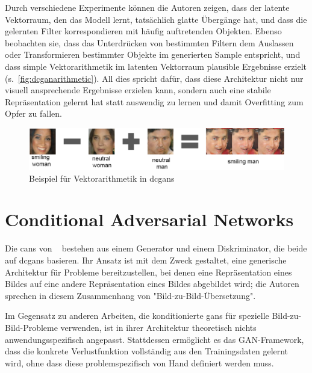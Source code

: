 Durch verschiedene Experimente können die Autoren zeigen, dass der latente Vektorraum, den das Modell lernt, tatsächlich glatte Übergänge hat, und dass die gelernten Filter korrespondieren mit häufig auftretenden Objekten.
Ebenso beobachten sie, dass das Unterdrücken von bestimmten Filtern dem Auslassen oder Transformieren bestimmter Objekte im generierten Sample entspricht, und dass simple Vektorarithmetik im latenten Vektorraum plausible Ergebnisse erzielt (s.~\autoref{fig:dcganarithmetic}).
All dies spricht dafür, dass diese Architektur nicht nur visuell ansprechende Ergebnisse erzielen kann, sondern auch eine stabile Repräsentation gelernt hat statt auswendig zu lernen und damit Overfitting zum Opfer zu fallen.

\begin{figure}
	\centering
	\includegraphics[width=0.9\linewidth]{img/dcgan_arithmetic}
	\caption[Beispiel für Vektorarithmetik in \glspl{dcgan}]{Beispiel für Vektorarithmetik in \glspl{dcgan}~\cite{Radford.2016}}
	\label{fig:dcganarithmetic}
\end{figure}



\section{Conditional Adversarial Networks}

Die \glspl{can} von \citeauthor{Isola.2017}~\cite{Isola.2017} bestehen aus einem Generator und einem Diskriminator, die beide auf \glspl{dcgan} basieren.
Ihr Ansatz ist mit dem Zweck gestaltet, eine generische Architektur für Probleme bereitzustellen, bei denen eine Repräsentation eines Bildes auf eine andere Repräsentation eines Bildes abgebildet wird; die Autoren sprechen in diesem Zusammenhang von "Bild-zu-Bild-Übersetzung".

Im Gegensatz zu anderen Arbeiten, die konditionierte \glspl{gan} für spezielle Bild-zu-Bild-Probleme verwenden, ist in ihrer Architektur theoretisch nichts anwendungsspezifisch angepasst.
Stattdessen ermöglicht es das GAN-Framework, dass die konkrete Verlustfunktion vollständig aus den Trainingsdaten gelernt wird, ohne dass diese problemspezifisch von Hand definiert werden muss.



